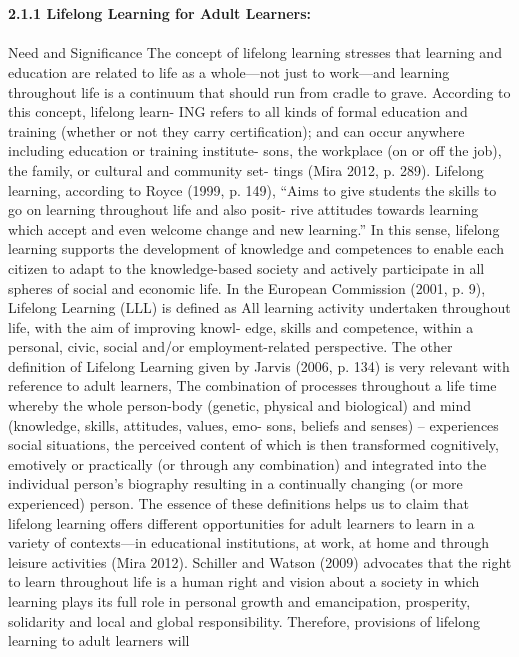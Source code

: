 \documentclass{article}
\begin{document}
\textit{\\\\}
\textbf{ 2.1.1 Lifelong Learning for Adult Learners: }
\textit{\\\\}
Need and Significance
The concept of lifelong learning stresses that learning and education are related
to life as a whole—not just to work—and learning throughout life is a continuum
that should run from cradle to grave. According to this concept, lifelong learn-
   ING refers to all kinds of formal education and training (whether or not they carry
certification); and can occur anywhere including education or training institute-
sons, the workplace (on or off the job), the family, or cultural and community set-
tings (Mira 2012, p. 289). Lifelong learning, according to Royce (1999, p. 149),
“Aims to give students the skills to go on learning throughout life and also posit-
rive attitudes towards learning which accept and even welcome change and new
learning.” In this sense, lifelong learning supports the development of knowledge
and competences to enable each citizen to adapt to the knowledge-based society
and actively participate in all spheres of social and economic life. In the European
Commission (2001, p. 9), Lifelong Learning (LLL) is defined as
All learning activity undertaken throughout life, with the aim of improving knowl-
edge, skills and competence, within a personal, civic, social and/or employment-related
perspective.
The other definition of Lifelong Learning given by Jarvis (2006, p. 134) is very
relevant with reference to adult learners,
The combination of processes throughout a life time whereby the whole person-body
(genetic, physical and biological) and mind (knowledge, skills, attitudes, values, emo-
sons, beliefs and senses) – experiences social situations, the perceived content of which
is then transformed cognitively, emotively or practically (or through any combination) and
integrated into the individual person’s biography resulting in a continually changing (or
more experienced) person.
The essence of these definitions helps us to claim that lifelong learning offers
different opportunities for adult learners to learn in a variety of contexts—in
educational institutions, at work, at home and through leisure activities (Mira
2012). Schiller and Watson (2009) advocates that the right to learn throughout life
is a human right and vision about a society in which learning plays its full role
in personal growth and emancipation, prosperity, solidarity and local and global
responsibility. Therefore, provisions of lifelong learning to adult learners will
\end{document}
